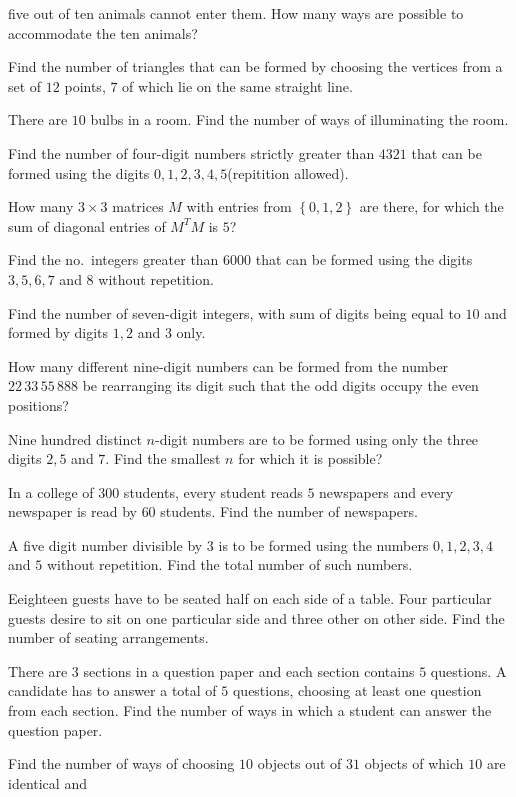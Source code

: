   five out of ten animals cannot enter them. How many ways are possible to accommodate the ten animals?
\item Find the number of triangles that can be formed by choosing the vertices from a set of $12$ points,
  $7$ of which lie on the same straight line.
\item There are $10$ bulbs in a room. Find the number of ways of illuminating the room.
\item Find the number of four-digit numbers strictly greater than $4321$ that can be formed using the digits
  $0, 1, 2, 3, 4, 5$(repitition allowed).
\item How many $3\times3$ matrices $M$ with entries from $\left\{0, 1, 2\right\}$ are there, for which the
  sum of diagonal entries of $M^TM$ is $5$?
\item Find the no.\ integers greater than $6000$ that can be formed using the digits $3, 5, 6, 7$ and $8$ without
  repetition.
\item Find the number of seven-digit integers, with sum of digits being equal to $10$ and formed by digits
  $1, 2$ and $3$ only.
\item How many different nine-digit numbers can be formed from the number $22\,33\,55\,888$ be rearranging
  its digit such that the odd digits occupy the even positions?
\item Nine hundred distinct $n$-digit numbers are to be formed using only the three digits $2, 5$ and
  $7$. Find the smallest $n$ for which it is possible?
\item In a college of $300$ students, every student reads $5$ newspapers and every newspaper is read by $60$
  students. Find the number of newspapers.
\item A five digit number divisible by $3$ is to be formed using the numbers $0, 1, 2, 3, 4$ and $5$ without
  repetition. Find the total number of such numbers.
\item Eeighteen guests have to be seated half on each side of a table. Four particular guests desire to sit
  on one particular side and three other on other side. Find the number of seating arrangements.
\item There are $3$ sections in a question paper and each section contains $5$ questions. A candidate has to
  answer a total of $5$ questions, choosing at least one question from each section. Find the number of ways
  in which a student can answer the question paper.
\item Find the number of ways of choosing $10$ objects out of $31$ objects of which $10$ are identical and
